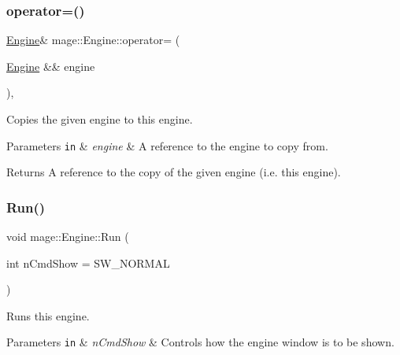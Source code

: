 \subsubsection{\texorpdfstring{operator=()}{operator=()}\hspace{0.1cm}{\footnotesize\ttfamily [2/2]}}
{\footnotesize\ttfamily \hyperlink{classmage_1_1_engine}{Engine}\& mage\+::\+Engine\+::operator= (\begin{DoxyParamCaption}\item[{\hyperlink{classmage_1_1_engine}{Engine} \&\&}]{engine }\end{DoxyParamCaption})\hspace{0.3cm}{\ttfamily [private]}, {\ttfamily [delete]}}

Copies the given engine to this engine.


\begin{DoxyParams}[1]{Parameters}
\mbox{\tt in}  & {\em engine} & A reference to the engine to copy from. \\
\hline
\end{DoxyParams}
\begin{DoxyReturn}{Returns}
A reference to the copy of the given engine (i.\+e. this engine). 
\end{DoxyReturn}
\hypertarget{classmage_1_1_engine_a246c82d0e55bc29e73aecbc365464ec8}{}\label{classmage_1_1_engine_a246c82d0e55bc29e73aecbc365464ec8} 
\subsubsection{\texorpdfstring{Run()}{Run()}}
{\footnotesize\ttfamily void mage\+::\+Engine\+::\+Run (\begin{DoxyParamCaption}\item[{int}]{n\+Cmd\+Show = {\ttfamily SW\+\_\+NORMAL} }\end{DoxyParamCaption})}

Runs this engine.


\begin{DoxyParams}[1]{Parameters}
\mbox{\tt in}  & {\em n\+Cmd\+Show} & Controls how the engine window is to be shown. \\
\hline
\end{DoxyParams}
\hypertarget{classmage_1_1_engine_a942bfa9892fa79bb1068d7c7ec4e6732}{}\label{classmage_1_1_engine_a942bfa9892fa79bb1068d7c7ec4e6732} 
